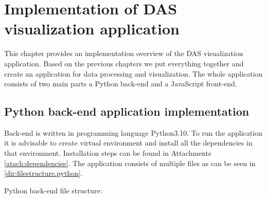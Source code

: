 
\chapter{Implementation of DAS visualization application}\label{txt.implementation}

This chapter provides an implementation overview of the DAS visualization application. Based on the previous chapters we put everything together and create an application for data processing and visualization. The whole application consists of two main parts a Python back-end and a JavaScript front-end. 

\section{Python back-end application implementation}\label{txt.implementation.python}

Back-end is written in programming language Python3.10. To run the application it is advisable to create virtual environment and install all the dependencies in that environment. Installation steps can be found in Attachments \ref{atach:dependencies}. The application consists of multiple files as can be seen in \ref{dir:filestructure.python}. 

\bigskip
Python back-end file structure:

{\small
%
\label{dir:filestructure.python}
}
\bigskip


